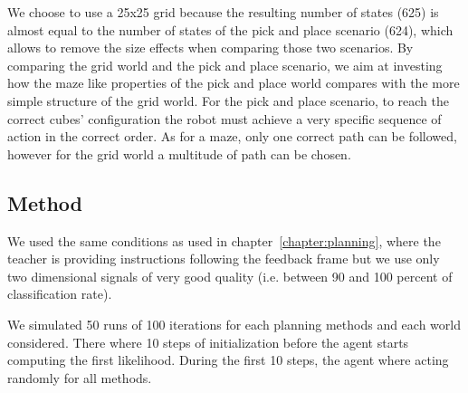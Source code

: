 We choose to use a 25x25 grid because the resulting number of states (625) is almost equal to the number of states of the pick and place scenario (624), which allows to remove the size effects when comparing those two scenarios. By comparing the grid world and the pick and place scenario, we aim at investing how the maze like properties of the pick and place world compares with the more simple structure of the grid world. For the pick and place scenario, to reach the correct cubes' configuration the robot must achieve a very specific sequence of action in the correct order. As for a maze, only one correct path can be followed, however for the grid world a multitude of path can be chosen.


\subsection{Method}

We used the same conditions as used in chapter~\ref{chapter:planning}, where the teacher is providing instructions following the feedback frame but we use only two dimensional signals of very good quality (i.e. between 90 and 100 percent of classification rate).

We simulated 50 runs of 100 iterations for each planning methods and each world considered. There where 10 steps of initialization before the agent starts computing the first likelihood. During the first 10 steps, the agent where acting randomly for all methods.

